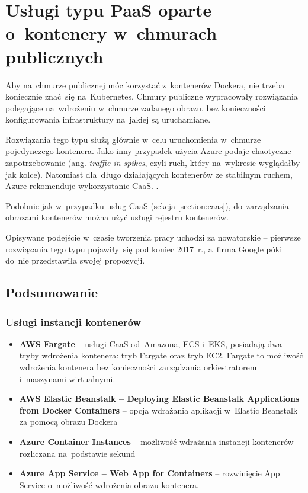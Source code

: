 \documentclass[12pt,a4paper,twoside,titlepage,openright]{book}
\begin{document}
\section{Usługi typu PaaS oparte o~kontenery w~chmurach publicznych}

Aby na~chmurze publicznej móc korzystać z~kontenerów Dockera, nie trzeba koniecznie znać~się na~Kubernetes. Chmury publiczne wypracowały rozwiązania polegające na~wdrożeniu w~chmurze zadanego obrazu, bez konieczności konfigurowania infrastruktury na~jakiej są uruchamiane.

Rozwiązania tego typu służą głównie w~celu uruchomienia w~chmurze pojedynczego kontenera. Jako inny przypadek użycia Azure podaje chaotyczne zapotrzebowanie (ang. \textit{traffic in spikes}, czyli ruch, który na~wykresie wyglądałby jak kolce). Natomiast dla~długo działających kontenerów ze stabilnym ruchem, Azure rekomenduje wykorzystanie CaaS. \cite{siteAzureContainerInstances}.

Podobnie jak w~przypadku usług CaaS (sekcja \ref{section:caas}), do~zarządzania obrazami kontenerów można użyć usługi rejestru kontenerów.

Opisywane podejście w~czasie tworzenia pracy uchodzi za nowatorskie -- pierwsze rozwiązania tego typu pojawiły~się pod koniec 2017~r., a~firma Google póki do~nie przedstawiła swojej propozycji.

\subsection*{Podsumowanie}

\subsubsection{Usługi instancji kontenerów}

\begin{itemize}
\item \textbf{AWS Fargate} -- usługi CaaS od~Amazona, ECS i~EKS, posiadają dwa tryby wdrożenia kontenera: tryb Fargate oraz tryb EC2. Fargate to możliwość wdrożenia kontenera bez konieczności zarządzania orkiestratorem i~maszynami wirtualnymi. \cite{siteAwsFargate}
\item \textbf{AWS Elastic Beanstalk -- Deploying Elastic Beanstalk Applications from Docker Containers} -- opcja wdrażania aplikacji w~Elastic Beanstalk za pomocą obrazu Dockera 
\item \textbf{Azure Container Instances} -- możliwość wdrażania instancji kontenerów rozliczana na~podstawie sekund \cite{siteAzureContainerInstances}
\item \textbf{Azure App Service -- Web App for Containers} -- rozwinięcie App Service o~możliwość wdrożenia obrazu kontenera.
\end{itemize}
\end{document}
